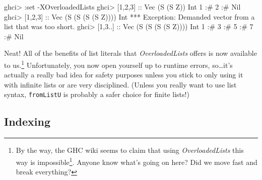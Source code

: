 \documentclass[]{article}
\newenvironment{Shaded}{}{}
\newcommand{\DataTypeTok}[1]{\textcolor[rgb]{0.56,0.13,0.00}{{#1}}}
\newcommand{\DecValTok}[1]{\textcolor[rgb]{0.25,0.63,0.44}{{#1}}}
\newcommand{\OtherTok}[1]{\textcolor[rgb]{0.00,0.44,0.13}{{#1}}}
\newcommand{\FunctionTok}[1]{\textcolor[rgb]{0.02,0.16,0.49}{{#1}}}
\newcommand{\NormalTok}[1]{{#1}}
\renewcommand{\href}[2]{#2\footnote{\url{#1}}}
\begin{document}
\begin{Shaded}
\begin{Highlighting}[]
\NormalTok{ghci}\FunctionTok{>} \FunctionTok{:}\NormalTok{set }\FunctionTok{-}\DataTypeTok{XOverloadedLists}
\NormalTok{ghci}\FunctionTok{>} \NormalTok{[}\DecValTok{1}\NormalTok{,}\DecValTok{2}\NormalTok{,}\DecValTok{3}\NormalTok{]}\OtherTok{ ::} \DataTypeTok{Vec} \NormalTok{(}\DataTypeTok{S} \NormalTok{(}\DataTypeTok{S} \DataTypeTok{Z}\NormalTok{)) }\DataTypeTok{Int}
\DecValTok{1} \FunctionTok{:#} \DecValTok{2} \FunctionTok{:#} \DataTypeTok{Nil}
\NormalTok{ghci}\FunctionTok{>} \NormalTok{[}\DecValTok{1}\NormalTok{,}\DecValTok{2}\NormalTok{,}\DecValTok{3}\NormalTok{]}\OtherTok{ ::} \DataTypeTok{Vec} \NormalTok{(}\DataTypeTok{S} \NormalTok{(}\DataTypeTok{S} \NormalTok{(}\DataTypeTok{S} \NormalTok{(}\DataTypeTok{S} \DataTypeTok{Z}\NormalTok{)))) }\DataTypeTok{Int}
\FunctionTok{***} \DataTypeTok{Exception}\FunctionTok{:} \DataTypeTok{Demanded} \NormalTok{vector from a list that was too short}\FunctionTok{.}
\NormalTok{ghci}\FunctionTok{>} \NormalTok{[}\DecValTok{1}\NormalTok{,}\DecValTok{3}\FunctionTok{..}\NormalTok{]}\OtherTok{ ::} \DataTypeTok{Vec} \NormalTok{(}\DataTypeTok{S} \NormalTok{(}\DataTypeTok{S} \NormalTok{(}\DataTypeTok{S} \NormalTok{(}\DataTypeTok{S} \DataTypeTok{Z}\NormalTok{)))) }\DataTypeTok{Int}
\DecValTok{1} \FunctionTok{:#} \DecValTok{3} \FunctionTok{:#} \DecValTok{5} \FunctionTok{:#} \DecValTok{7} \FunctionTok{:#} \DataTypeTok{Nil}
\end{Highlighting}
\end{Shaded}

Neat! All of the benefits of list literals that \emph{OverloadedLists} offers is
now available to us.\footnote{By the way, the GHC wiki seems to claim that
  \href{https://ghc.haskell.org/trac/ghc/wiki/OverloadedLists\#Length-indexedobservedVectors}{using
  \emph{OverloadedLists} this way is impossible}. Anyone know what's going on
  here? Did we move fast and break everything?} Unfortunately, you now open
yourself up to runtime errors, so\ldots{}it's actually a really bad idea for
safety purposes unless you stick to only using it with infinite lists or are
very disciplined. (Unless you really want to use list syntax, \texttt{fromListU}
is probably a safer choice for finite lists!)

\subsection{Indexing}\label{indexing}
\end{document}
